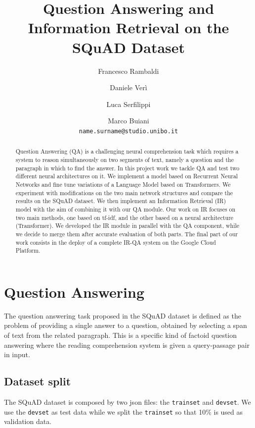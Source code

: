 \documentclass{article}
\newcommand{\code}[1]{\colorbox{light-gray}{\texttt{#1}}}
\begin{document}
%
\title{Question Answering and Information Retrieval on the SQuAD Dataset}

\author{
Francesco Rambaldi \and Daniele Verì \and Luca Serfilippi \and Marco Buiani \\
\texttt{name.surname@studio.unibo.it}
}

\date{}

\maketitle

\begin{abstract}
Question Answering (QA) is a challenging neural comprehension task which requires a system to reason simultaneously on two segments of text, namely a question and the paragraph in which to find the answer. In this project work we tackle QA and test two different neural architectures on it. We implement a model based on Recurrent Neural Networks and fine tune variations of a Language Model based on Transformers. We experiment with modifications on the two main network structures and compare the results on the SQuAD dataset.
We then implement an Information Retrieval (IR) model with the aim of combining it with our QA module. Our work on IR focuses on two main methods, one based on tf-idf, and the other based on a neural architecture (Transformer). We developed the IR module in parallel with the QA component, while we decide to merge them after accurate evaluation of both parts. 
The final part of our work consists in the deploy of a complete IR-QA system on the Google Cloud Platform.
\end{abstract}\hspace{10pt}


\section{Question Answering}

The question answering task proposed in the SQuAD dataset is defined as the problem of providing a single answer to a question, obtained by selecting a span of text from the related paragraph.
This is a specific kind of factoid question answering where the reading comprehension system is given a query-passage pair in input. 

\subsection{Dataset split}\label{dataset_split}
The SQuAD dataset is composed by two json files: the \code{trainset} and \code{devset}. We use the \code{devset} as test data while we split the \code{trainset} so that 10\% is used as validation data.
\end{document}
